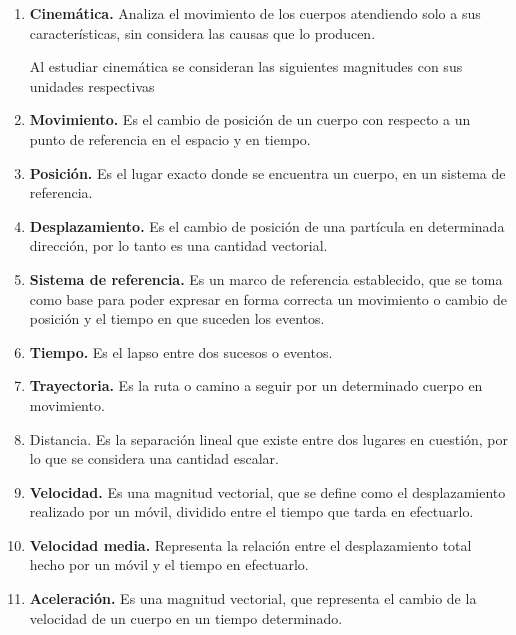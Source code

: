 \documentclass[14pt]{extarticle}
\begin{document}
\begin{enumerate}[label=\roman*)]
\item \textbf{Cinemática.} Analiza el movimiento de los cuerpos atendiendo solo a sus características, sin considera las causas que lo producen.

Al estudiar cinemática se consideran las siguientes magnitudes con sus unidades respectivas
\item \textbf{Movimiento.} Es el cambio de posición de un cuerpo con respecto a un punto de referencia en el espacio y en tiempo.
\item \textbf{Posición.} Es el lugar exacto donde se encuentra un cuerpo, en un sistema de referencia.
\item \textbf{Desplazamiento.} Es el cambio de posición de una partícula en determinada dirección, por lo tanto es una cantidad vectorial.
\item \textbf{Sistema de referencia.} Es un marco de referencia establecido, que se toma como base para poder expresar en forma correcta un movimiento o cambio de posición y el tiempo en que suceden los eventos.
\item \textbf{Tiempo.} Es el lapso entre dos sucesos o eventos.
\item \textbf{Trayectoria.} Es la ruta o camino a seguir por un determinado cuerpo en movimiento.
\item Distancia. Es la separación lineal que existe entre dos lugares en cuestión, por lo que se considera una cantidad escalar.
\item \textbf{Velocidad.} Es una magnitud vectorial, que se define como el desplazamiento realizado por un móvil, dividido entre el tiempo que tarda en efectuarlo.
\item \textbf{Velocidad media.} Representa la relación entre el desplazamiento total hecho por un móvil y el tiempo en efectuarlo.
\item \textbf{Aceleración.} Es una magnitud vectorial, que representa el cambio de la velocidad de un cuerpo en un tiempo determinado.
\end{enumerate}
\end{document}
